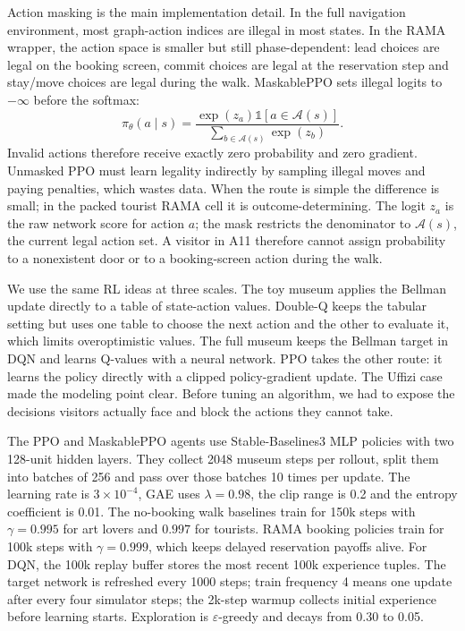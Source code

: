 \documentclass[11pt]{article}
\newcommand{\Acal}{\mathcal{A}}
\newcommand{\ind}{\mathbb{1}}
\newcommand{\added}[1]{{\color{green!50!black}#1}}
\newenvironment{addedblock}{\begingroup\color{green!50!black}}{\endgroup}
\begin{document}
Action masking is the main implementation detail. In the full navigation environment, most graph-action
indices are illegal in most states. In the RAMA wrapper, the action space is smaller but still
phase-dependent: lead choices are legal on the booking screen, commit choices are legal at the
reservation step and stay/move choices are legal during the walk. MaskablePPO sets illegal logits to
$-\infty$ before the softmax:
\[
\pi_\theta(a\mid s)=
\frac{\exp(z_a)\ind[a\in\Acal(s)]}
{\sum_{b\in\Acal(s)}\exp(z_b)}.
\]
Invalid actions therefore receive exactly zero probability and zero gradient. Unmasked PPO must learn
legality indirectly by sampling illegal moves and paying penalties, which wastes data. When the route
is simple the difference is small; in the packed tourist RAMA cell it is outcome-determining. \added{The logit
$z_a$ is the raw network score for action $a$; the mask restricts the denominator to $\Acal(s)$, the
current legal action set. A visitor in A11 therefore cannot assign probability to a nonexistent door
or to a booking-screen action during the walk.}

\begin{addedblock}
We use the same RL ideas at three scales. The toy museum applies the Bellman update directly to a
table of state-action values. Double-Q keeps the tabular setting but uses one table to choose the next
action and the other to evaluate it, which limits overoptimistic values. The full museum keeps the
Bellman target in DQN and learns Q-values with a neural network. PPO takes the other route: it learns
the policy directly with a clipped policy-gradient update. The Uffizi case made the
modeling point clear. Before tuning an algorithm, we had to expose the decisions visitors actually
face and block the actions they cannot take.
\end{addedblock}

The PPO and MaskablePPO agents use Stable-Baselines3 MLP policies with two 128-unit hidden layers.
They collect 2048 museum steps per rollout, split them into batches of 256 and pass over those batches
10 times per update. The learning rate is $3\times10^{-4}$, GAE uses $\lambda=0.98$, the clip range is
0.2 and the entropy coefficient is 0.01. The no-booking walk baselines train for 150k steps with
$\gamma=0.995$ for art lovers and $0.997$ for tourists. RAMA booking policies train for 100k steps
with $\gamma=0.999$, which keeps delayed reservation payoffs alive. \added{For DQN, the 100k replay
buffer stores the most recent 100k experience tuples. The target network is refreshed every 1000
steps; train frequency 4 means one update after every four simulator steps; the 2k-step warmup
collects initial experience before learning starts. Exploration is $\varepsilon$-greedy and decays
from 0.30 to 0.05.}
\end{document}
